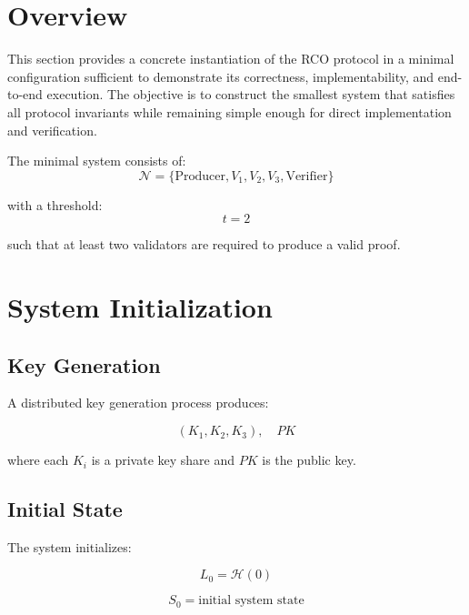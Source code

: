 \section{Overview}

This section provides a concrete instantiation of the RCO protocol in a minimal configuration sufficient to demonstrate its correctness, implementability, and end-to-end execution. The objective is to construct the smallest system that satisfies all protocol invariants while remaining simple enough for direct implementation and verification.

The minimal system consists of:
\begin{equation}
\mathcal{N} = \{\text{Producer}, V_1, V_2, V_3, \text{Verifier}\}
\end{equation}

with a threshold:
\begin{equation}
t = 2
\end{equation}

such that at least two validators are required to produce a valid proof.

\section{System Initialization}

\subsection{Key Generation}

A distributed key generation process produces:

\begin{equation}
(K_1, K_2, K_3), \quad PK
\end{equation}

where each $K_i$ is a private key share and $PK$ is the public key.

\subsection{Initial State}

The system initializes:

\begin{equation}
L_0 = \mathcal{H}(0)
\end{equation}

\begin{equation}
S_0 = \text{initial system state}
\end{equation}

